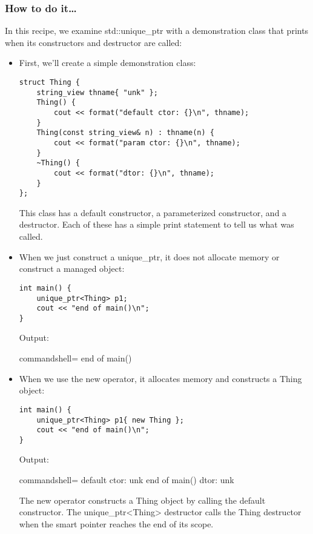 \subsubsection{How to do it…}

In this recipe, we examine std::unique\_ptr with a demonstration class that prints when its constructors and destructor are called:

\begin{itemize}
\item 
First, we'll create a simple demonstration class:

\begin{lstlisting}[style=styleCXX]
struct Thing {
	string_view thname{ "unk" };
	Thing() {
		cout << format("default ctor: {}\n", thname);
	}
	Thing(const string_view& n) : thname(n) {
		cout << format("param ctor: {}\n", thname);
	}
	~Thing() {
		cout << format("dtor: {}\n", thname);
	}
};
\end{lstlisting}

This class has a default constructor, a parameterized constructor, and a destructor. Each of these has a simple print statement to tell us what was called.

\item 
When we just construct a unique\_ptr, it does not allocate memory or construct a managed object:

\begin{lstlisting}[style=styleCXX]
int main() {
	unique_ptr<Thing> p1;
	cout << "end of main()\n";
}
\end{lstlisting}

Output:

\begin{tcblisting}{commandshell={}}
end of main()
\end{tcblisting}


\item 
When we use the new operator, it allocates memory and constructs a Thing object:

\begin{lstlisting}[style=styleCXX]
int main() {
	unique_ptr<Thing> p1{ new Thing };
	cout << "end of main()\n";
}
\end{lstlisting}

Output:

\begin{tcblisting}{commandshell={}}
default ctor: unk
end of main()
dtor: unk
\end{tcblisting}

The new operator constructs a Thing object by calling the default constructor. The unique\_ptr<Thing> destructor calls the Thing destructor when the smart pointer reaches the end of its scope.


\end{itemize}
